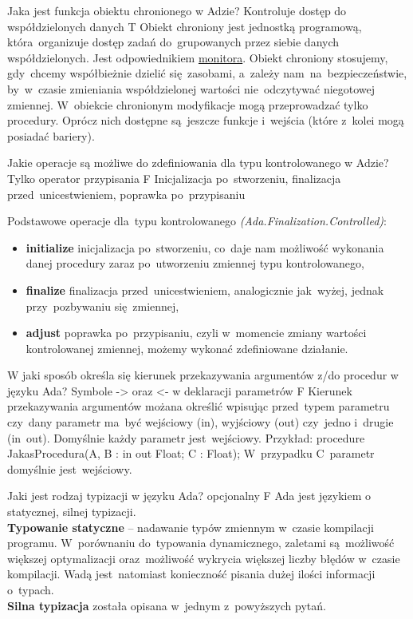 \answerC
{Jaka jest funkcja obiektu chronionego w Adzie?}
{Kontroluje dostęp do współdzielonych danych}
{T}
{Obiekt chroniony jest jednostką programową, która~organizuje dostęp zadań do~grupowanych przez siebie danych współdzielonych. Jest odpowiednikiem \underline{monitora}. Obiekt chroniony stosujemy, gdy~chcemy współbieżnie dzielić się~zasobami, a~zależy nam~na~bezpieczeństwie, by~w~czasie zmieniania współdzielonej wartości nie~odczytywać niegotowej zmiennej. W~obiekcie chronionym modyfikacje mogą przeprowadzać tylko procedury. Oprócz nich dostępne są~jeszcze funkcje i~wejścia (które z~kolei mogą posiadać bariery).}

\newpage

\answerA
{Jakie operacje są możliwe do zdefiniowania dla typu kontrolowanego w Adzie?}
{Tylko operator przypisania}
{F}
{Inicjalizacja po~stworzeniu, finalizacja przed~unicestwieniem, poprawka po~przypisaniu}
{Podstawowe operacje dla~typu kontrolowanego \emph{(Ada.Finalization.Controlled)}:
\begin{itemize}
\item \textbf{initialize} inicjalizacja po~stworzeniu, co~daje nam możliwość wykonania danej procedury zaraz po~utworzeniu zmiennej typu kontrolowanego,
\item \textbf{finalize} finalizacja przed~unicestwieniem, analogicznie jak~wyżej, jednak przy~pozbywaniu się~zmiennej,
\item \textbf{adjust} poprawka po~przypisaniu, czyli w~momencie zmiany wartości kontrolowanej zmiennej, możemy wykonać zdefiniowane działanie.
\end{itemize}}

\answerB
{W jaki sposób określa się kierunek przekazywania argumentów z/do procedur w języku Ada?}
{Symbole -> oraz <- w deklaracji parametrów}
{F}
{Kierunek przekazywania argumentów możana określić wpisując przed~typem parametru czy~dany parametr ma~być wejściowy (in), wyjściowy (out) czy~jedno i~drugie (in~out). Domyślnie każdy parametr jest~wejściowy. Przykład: procedure JakasProcedura(A, B : in out Float; C : Float); W~przypadku C~parametr domyślnie jest~wejściowy.}

\answerA
{Jaki jest rodzaj typizacji w języku Ada?}
{opcjonalny}
{F}
{Ada jest językiem o statycznej, silnej typizacji.}
{\\
\textbf{Typowanie statyczne} – nadawanie typów zmiennym w~czasie kompilacji programu. W~porównaniu do~typowania dynamicznego, zaletami są~możliwość większej optymalizacji oraz~możliwość wykrycia większej liczby błędów w~czasie kompilacji. Wadą jest~natomiast konieczność pisania dużej ilości informacji o~typach. \\
\textbf{Silna typizacja} została opisana w~jednym z~powyższych pytań.}

